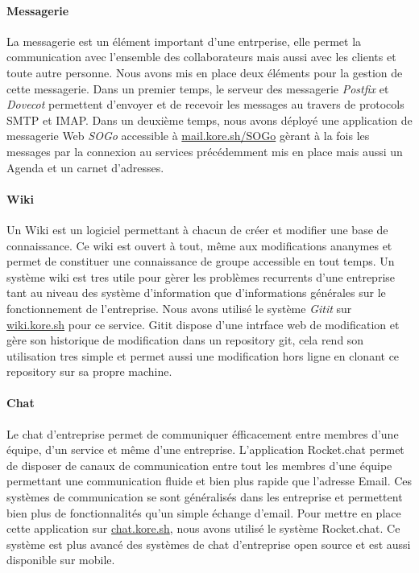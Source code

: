 \paragraph{Messagerie} La messagerie est un élément important d'une entrperise, elle permet la communication avec l'ensemble des collaborateurs mais aussi avec les clients et toute autre personne.
Nous avons mis en place deux éléments pour la gestion de cette messagerie.
Dans un premier temps, le serveur des messagerie \emph{Postfix} et \emph{Dovecot} permettent d'envoyer et de recevoir les messages au travers de protocols SMTP et IMAP.
Dans un deuxième temps, nous avons déployé une application de messagerie Web \emph{SOGo} accessible à \url{mail.kore.sh/SOGo} gèrant à la fois les messages par la connexion au services précédemment mis en place mais aussi un Agenda et un carnet d'adresses.

\paragraph{Wiki} Un Wiki est un logiciel permettant à chacun de créer et modifier une base de connaissance.
Ce wiki est ouvert à tout, même aux modifications ananymes et permet de constituer une connaissance de groupe accessible en tout temps.
Un système wiki est tres utile pour gèrer les problèmes recurrents d'une entreprise tant au niveau des système d'information que d'informations générales sur le fonctionnement de l'entreprise.
Nous avons utilisé le système \emph{Gitit} sur \url{wiki.kore.sh} pour ce service.
Gitit dispose d'une intrface web de modification et gère son historique de modification dans un repository git, cela rend son utilisation tres simple et permet aussi une modification hors ligne en clonant ce repository sur sa propre machine.

\paragraph{Chat} Le chat d'entreprise permet de communiquer éfficacement entre membres d'une équipe, d'un service et même d'une entreprise.
L'application Rocket.chat permet de disposer de canaux de communication entre tout les membres d'une équipe permettant une communication fluide et bien plus rapide que l'adresse Email.
Ces systèmes de communication se sont généralisés dans les entreprise et permettent bien plus de fonctionnalités qu'un simple échange d'email.
Pour mettre en place cette application sur \url{chat.kore.sh}, nous avons utilisé le système Rocket.chat.
Ce système est plus avancé des systèmes de chat d'entreprise open source et est aussi disponible sur mobile.


